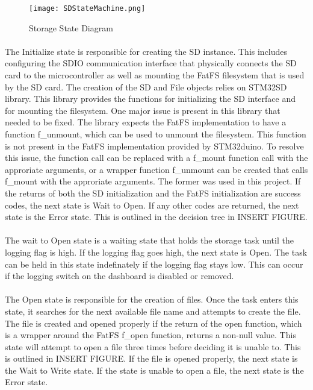 \begin{figure}[H]
	\centering
	\texttt{[image: SDStateMachine.png]}
	\caption{Storage State Diagram}
	\label{fig:StorageDiagram}
\end{figure}

\paragraph{}
The Initialize state is responsible for creating the SD instance.
This includes configuring the SDIO communication interface that physically connects the SD card to the microcontroller as well as mounting the FatFS filesystem that is used by the SD card.
The creation of the SD and File objects relies on STM32SD library.
This library provides the functions for initializing the SD interface and for mounting the filesystem.
One major issue is present in this library that needed to be fixed.
The library expects the FatFS implementation to have a function f\_unmount, which can be used to unmount the filesystem.
This function is not present in the FatFS implementation provided by STM32duino.
To resolve this issue, the function call can be replaced with a f\_mount function call with the approriate arguments, or a wrapper function f\_unmount can be created that calls f\_mount with the approriate arguments.
The former was used in this project.
If the returns of both the SD initialization and the FatFS initialization are success codes, the next state is Wait to Open.
If any other codes are returned, the next state is the Error state.
This is outlined in the decision tree in INSERT FIGURE.

\paragraph{}
The wait to Open state is a waiting state that holds the storage task until the logging flag is high.
If the logging flag goes high, the next state is Open.
The task can be held in this state indefinately if the logging flag stays low.
This can occur if the logging switch on the dashboard is disabled or removed.

\paragraph{}
The Open state is responsible for the creation of files.
Once the task enters this state, it searches for the next available file name and attempts to create the file.
The file is created and opened properly if the return of the open function, which is a wrapper around the FatFS f\_open function, returns a non-null value.
This state will attempt to open a file three times before deciding it is unable to.
This is outlined in INSERT FIGURE.
If the file is opened properly, the next state is the Wait to Write state.
If the state is unable to open a file, the next state is the Error state.

